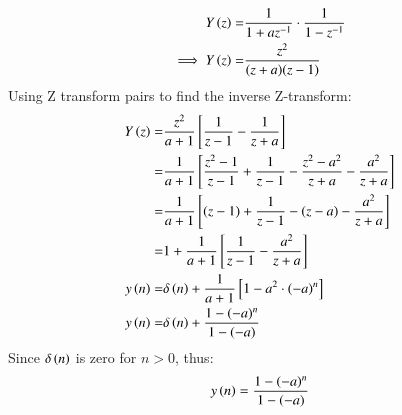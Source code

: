 \documentclass[journal,12pt,twocolumn]{IEEEtran}
\theoremstyle{remark}
\begin{document}
\begin{align}
    Y\left(z\right) = &\frac{1}{1+az^{-1}}\cdot\frac{1}{1-z^{-1}}\\
    \implies Y\left(z\right) = &\frac{z^{2}}{(z+a)(z-1)}
\end{align}
Using Z transform pairs  to find the inverse Z-transform:\\
\begin{align}
    Y\left(z\right)=& \frac{z^{2}}{a+1}{}\left[\frac{1}{z-1} - \frac{1}{z+a}\right]\\
    =& \frac{1}{a+1}{}\left[\frac{z^{2}-1}{z-1}+\frac{1}{z-1} -\frac{z^{2}-a^{2}}{z+a} -\frac{a^{2}}{z+a}\right] \\
    =& \frac{1}{a+1}{}\left[(z-1)+\frac{1}{z-1}-(z-a)-\frac{a^{2}}{z+a}\right]\\
    =& 1+\frac{1}{a+1}{}\left[\frac{1}{z-1}-\frac{a^{2}}{z+a}\right]\\
    y\left(n\right) =& \delta\left(n\right) + \frac{1}{a+1}{}\left[1- a^{2}\cdot(-a)^{n}\right]\\
    y\left(n\right) =& \delta\left(n\right)+ \frac{1-(-a)^{n}}{1-(-a)}\\
\end{align}
Since $\delta\left(n\right)$ is zero for $n>0$, thus:
\begin{align}
    y\left(n\right)=\frac{1-(-a)^{n}}{1-(-a)}\\
\end{align}
\end{document}
